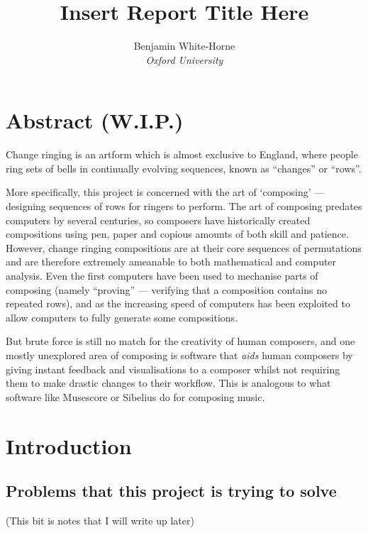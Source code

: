 \documentclass[12pt]{article}
\title{Insert Report Title Here}
\author{Benjamin White-Horne \\ \emph{Oxford University}}
\begin{document}
\maketitle

\pagebreak

\section*{Abstract (W.I.P.)}

Change ringing is an artform which is almost exclusive to England, where people ring sets of bells
in continually evolving sequences, known as ``changes'' or ``rows''.  

More specifically, this project is concerned with the art of `composing' --- designing sequences of
rows for ringers to perform.  The art of composing predates computers by several centuries, so
composers have historically created compositions using pen, paper and copious amounts of both skill and
patience.  However, change ringing compositions are at their core sequences of permutations and are
therefore extremely ameanable to both mathematical and computer analysis.  Even the
first computers have been used to mechanise parts of composing (namely ``proving'' --- verifying
that a composition contains no repeated rows), and as the increasing speed of computers has been
exploited to allow computers to fully generate some compositions.

But brute force is still no match for the creativity of human composers, and one mostly unexplored area
of composing is software that \emph{aids} human composers by giving instant feedback and
visualisations to a composer whilst not requiring them to make drastic changes to their workflow.
This is analogous to what software like Musescore or Sibelius do for composing music.

\pagebreak

\tableofcontents

\pagebreak

\section{Introduction}

\subsection{Problems that this project is trying to solve}

(This bit is notes that I will write up later)
\end{document}

